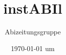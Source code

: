 \begin{titlepage}

\titlehead{Fichte-Gymnasium Karlsruhe}
\subject{Abizeitung}
\title{instABIl}
\author{Abizeitungsgruppe}
\date{\today \/ um \currenttime}
\publishers{erzeugt durch Abi\TeX}

\maketitle
\end{titlepage}
